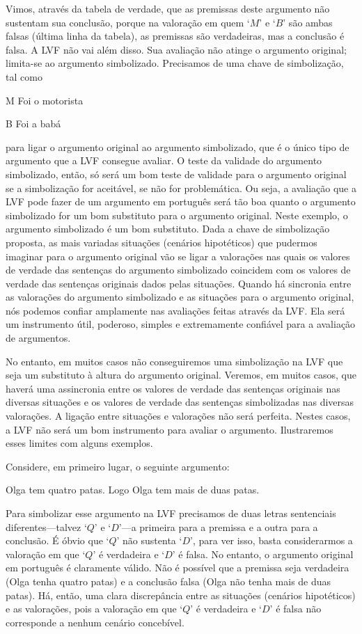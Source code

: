 Vimos, através da tabela de verdade, que as premissas deste argumento não sustentam sua conclusão, porque na valoração em quem `$M$' e `$B$' são ambas falsas (última linha da tabela), as premissas são verdadeiras, mas a conclusão é falsa.  
A LVF não vai além disso.
Sua avaliação não atinge o argumento original; limita-se ao argumento simbolizado.
Precisamos de uma chave de simbolização, tal como
\begin{ekey}
	\item[M] Foi o motorista
	\item[B] Foi a babá
\end{ekey}
para ligar o argumento original ao argumento simbolizado, que é o único tipo de argumento que a LVF consegue avaliar.
O teste da validade do argumento simbolizado, então, só será um bom teste de validade para o argumento original se a simbolização for aceitável, se não for problemática.
Ou seja, a avaliação que a LVF pode fazer de um argumento em português será tão boa quanto o argumento simbolizado for um bom substituto para o argumento original.
Neste exemplo, o argumento simbolizado é um bom substituto.
Dada a chave de simbolização proposta, as mais variadas situações (cenários hipotéticos) que pudermos imaginar para o argumento original vão se ligar a valorações nas quais os valores de verdade das sentenças do argumento simbolizado coincidem com os valores de verdade das sentenças originais dados pelas situações.
Quando há sincronia entre as valorações do argumento simbolizado e as situações para o argumento original, nós podemos confiar amplamente nas avaliações feitas através da LVF.
Ela será um instrumento útil, poderoso, simples e extremamente confiável para a avaliação de argumentos.

No entanto, em muitos casos não conseguiremos uma simbolização na LVF que seja um substituto à altura do argumento original.
Veremos, em muitos casos, que haverá uma assincronia entre os valores de verdade das sentenças originais nas diversas situações e os valores de verdade das sentenças simbolizadas nas diversas valorações.
A ligação entre situações e valorações não será perfeita.
Nestes casos, a LVF não será um bom instrumento para avaliar o argumento.
Ilustraremos esses limites com alguns exemplos.

Considere, em primeiro lugar, o seguinte argumento:
	\begin{earg}
		\item Olga tem quatro patas. Logo Olga tem mais de duas patas.
	\end{earg}
Para simbolizar esse argumento na LVF precisamos de duas letras sentenciais diferentes---talvez `$Q$' e `$D$'---a primeira para a premissa e a outra para a conclusão.
É óbvio que `$Q$' não sustenta `$D$', para ver isso, basta considerarmos a valoração em que `$Q$' é verdadeira e `$D$' é falsa.
No entanto, o argumento original em português é claramente válido.
Não é possível que a premissa seja verdadeira (Olga tenha quatro patas) e a conclusão falsa (Olga não tenha mais de duas patas).
Há, então, uma clara discrepância entre as situações (cenários hipotéticos) e as valorações, pois a valoração em que `$Q$' é verdadeira e `$D$' é falsa não corresponde a nenhum cenário concebível.

